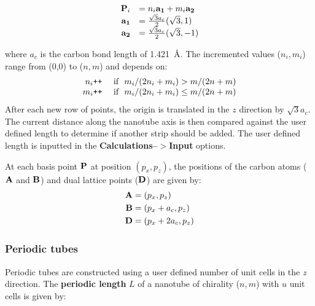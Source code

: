 \begin{equation*}
\begin{array}{rl}
 \boldsymbol{\mathrm{P}}_i  & =  n_i\boldsymbol{\mathrm{a_1}} + m_i\boldsymbol{\mathrm{a_2}}\\
 \boldsymbol{\mathrm{a_1}}  &=  \tfrac{\sqrt{3}a_c}{2} (\sqrt{3}, 1)\\
 \boldsymbol{\mathrm{a_2}}  &=  \tfrac{\sqrt{3}a_c}{2} (\sqrt{3}, -1)\\
\end{array}
\end{equation*}

\noindent where $a_c$ is the carbon bond length of 1.421~\AA. The incremented values ($n_i,m_i$) range from (0,0) to ($n,m$) and depends on:
\begin{equation*}
\begin{array}{rl}
n_i\verb!++! &\mbox{ if~~$m_i/( 2n_i+m_i)>m/( 2n+m)$} \\
m_i\verb!++! &\mbox{ if~~$m_i/( 2n_i+m_i)\leq m/( 2n+m)$} \\
 \end{array}
\end{equation*}
\noindent After each new row of points, the origin is translated in the $z$ direction by $\sqrt{3}a_c$. The current distance along the nanotube axis is then compared against the user defined length to determine if another strip should be added. The user defined length is inputted in the \textbf{Calculations--$>$Input} options.
 

At each basis point $\boldsymbol{\mathrm{P}}$ at position $(p_x,p_z)$, the positions of the carbon atoms ($\boldsymbol{\mathrm{A}}$ and  $\boldsymbol{\mathrm{B}}$) and dual lattice points ($\boldsymbol{\mathrm{D}}$) are given by:
\begin{equation*}
\begin{split}
\boldsymbol{\mathrm{A}} &=  (p_x  , p_z)\\
\boldsymbol{\mathrm{B}} &=  (p_x +a_c  , p_z)\\
 \boldsymbol{\mathrm{D}} &=  (p_x + 2a_c , p_z)
 \end{split}
\end{equation*}

 
\subsubsection{Periodic tubes}

Periodic tubes are constructed using a user defined number of unit cells in the \textit{z} direction. The \textbf{periodic length}  $L$ of a nanotube of chirality ($n,m$) with $u$ unit cells is given by:

